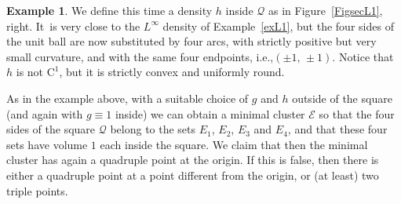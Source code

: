\documentclass[11pt]{article}
\newcommand{\ie}{i.e.,\xspace}
\numberwithin{equation}{section}
\newcommand\Q{\mathcal{Q}}
\newcommand\E{\mathcal{E}}
\theoremstyle{plain}
\theoremstyle{definition}
\newtheorem{example}[thm]{Example}
\begin{document}
\begin{example}\label{exL2}
We define this time a density $h$ inside $\Q$ as in Figure~\ref{FigsecL1}, right. It~is very close to the $L^\infty$ density of Example~\ref{exL1}, but the four sides of the unit ball are now substituted by four arcs, with strictly positive but very small curvature, and with the same four endpoints, \ie $(\pm 1,\,\pm 1)$. Notice that $h$ is not $\mathrm{C}^1$, but it is strictly convex and uniformly round.

As in the example above, with a suitable choice of $g$ and $h$ outside of the square (and again with $g\equiv 1$ inside) we can obtain a minimal cluster $\E$ so that the four sides of the square $\Q$ belong to the sets $E_1$, $E_2$, $E_3$ and $E_4$, and that these four sets have volume $1$ each inside the square. We claim that then the minimal cluster has again a quadruple point at the origin. If this is false, then there is either a quadruple point at a point different from the origin, or (at least) two triple points.


\end{example}
\end{document}

